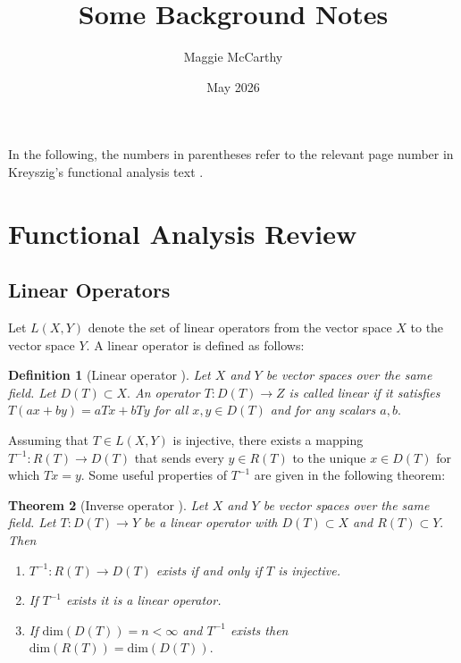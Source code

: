 \documentclass[12pt,a4paper]{article}
\title{Some Background Notes}
\author{Maggie McCarthy}
\date{May 2026}
\theoremstyle{boldthm}
\newtheorem{theorem}{Theorem}[section]
\theoremstyle{bolddefn}
\newtheorem{definition}[theorem]{Definition}
\begin{document}
\maketitle


In the following, the numbers in parentheses refer to the relevant page number in Kreyszig's functional analysis text \cite{krey}. 

\section{Functional Analysis Review}


\subsection{Linear Operators}

Let $L(X, Y)$ denote the set of linear operators from the vector space $X$ to the vector space $Y.$ A linear operator is defined as follows:
\begin{definition}[{Linear operator \cite[2.6-1]{krey}}]
    Let $X$ and $Y$ be vector spaces over the same field. Let $D(T) \subset X.$
   An operator $T : D(T) \rightarrow Z$ is called linear if it satisfies  $T(ax+by) = aTx + bTy$ for all $x, y \in D(T)$ and for any scalars $a, b.$ 
\end{definition}

Assuming that $T \in L(X, Y)$ is injective, there exists a mapping $T^{-1}: R(T) \rightarrow D(T)$ that sends every $y \in R(T)$ to the unique $x \in D(T)$ for which $Tx = y.$ Some useful properties of $T^{-1}$ are given in the following theorem:

\begin{theorem}[{Inverse operator \cite[2.6-10]{krey}}] \label{inv}
Let $X$ and $Y$ be vector spaces over the same field. Let $T : D(T) \rightarrow Y$ be a linear operator with $D(T) \subset X$ and $R(T) \subset Y.$ Then 
\begin{enumerate}
    \item $T^{-1} : R(T) \rightarrow D(T)$ exists if and only if $T$ is injective.
    \item If $T^{-1}$ exists it is a linear operator.
    \item If $\text{dim}(D(T)) = n < \infty$ and $T^{-1}$ exists then $\text{dim}(R(T)) = \text{dim}(D(T)).$
\end{enumerate}
    
\end{theorem}
\end{document}
